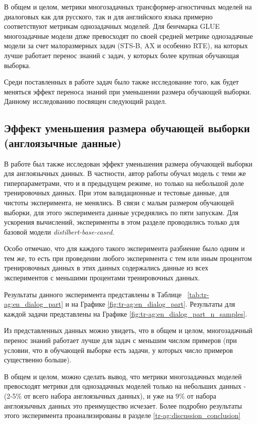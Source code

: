 \begin{table*}
В общем и целом, метрики многозадачных трансформер-агностичных моделей на диалоговых как для русского, так и для английского языка примерно соответствуют метрикам однозадачных моделей. 
 Для бенчмарка GLUE многозадачные модели дпже превосходят по своей средней метрике однозадачные модели за счет малоразмерных задач (STS-B, AX и особенно RTE), на которых лучше работает перенос знаний с задач, у которых более крупная обучающая выборка. 

Среди поставленных в работе задач было также исследование того, как будет меняться эффект переноса знаний при уменьшении размера обучающей выборки. Данному исследованию посвящен следующий раздел. 

\subsection{Эффект уменьшения размера обучающей выборки (англоязычные данные)}
В работе был также исследован эффект уменьшения размера обучающей выборки для англоязычных данных. В частности, автор работы обучал модель с теми же гиперпараметрами, что и в предыдущем режиме, но только на небольшой доле тренировочных данных. При этом валидационные и тестовые данные, для чистоты эксперимента, не менялись. В связи с малым размером обучающей выборки, для этого эксперимента данные усреднялись по пяти запускам. Для ускорения вычислений, эксперименты в этом разделе проводились только для базовой модели \textit{distilbert-base-cased}. 

Особо отмечаю, что для каждого такого эксперимента разбиение было одним и тем же, то есть при проведении любого эксперимента с тем или иным процентом тренировочных данных в этих данных содержались данные из всех экспериментов с меньшими процентами тренировочных данных. 

Результаты данного эксперимента представлены в Таблице ~\ref{tab:tr-ag:en_dialog_part} и на Графике \ref{fig:tr-ag:en_dialog_part}. Результаты для каждой задачи представлены на Графике  \ref{fig:tr-ag:en_dialog_part_n_samples}. %

Из представленных данных можно увидеть, что в общем и целом, многозадачный перенос знаний работает лучше для задач с меньшим числом примеров (при условии, что в обучающей выборке есть задачи, у которых число примеров существенно больше). 

В общем и целом, можно сделать вывод, что метрики многозадачных моделей превосходят метрики для однозадачных моделей только на небольших данных -(2-5\% от всего набора англоязычных данных), и уже на 9\% от набора англоязычных данных это преимущество исчезает. Более подробно результаты этого эксперимента проанализированы в разделе \ref{tr-ag:discussion_conclusion}


\end{table*}
